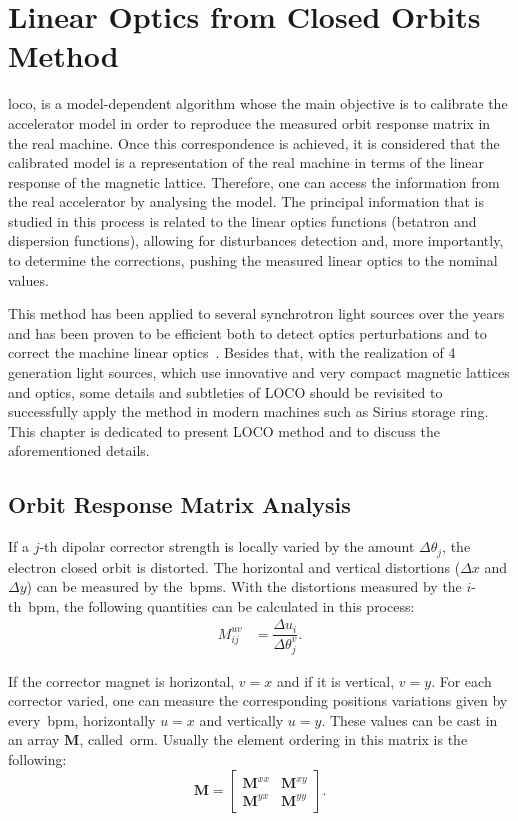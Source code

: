 \chapter{Linear Optics from Closed Orbits Method}\label{chap:loco}
\gls{loco}, is a model-dependent algorithm whose the main objective is to calibrate the accelerator model in order to reproduce the measured orbit response matrix in the real machine. Once this correspondence is achieved, it is considered that the calibrated model is a representation of the real machine in terms of the linear response of the magnetic lattice. Therefore, one can access the information from the real accelerator by analysing the model. The principal information that is studied in this process is related to the linear optics functions (betatron and dispersion functions), allowing for disturbances detection and, more importantly, to determine the corrections, pushing the measured linear optics to the nominal values.

This method has been applied to several synchrotron light sources over the years and has been proven to be efficient both to detect optics perturbations and to correct the machine linear optics~\cite{safranek1997, icfa_laurent, icfa_australia}. Besides that, with the realization of 4 generation light sources, which use innovative and very compact magnetic lattices and optics, some details and subtleties of LOCO should be revisited to successfully apply the method in modern machines such as Sirius storage ring. This chapter is dedicated to present LOCO method and to discuss the aforementioned details.
\section{Orbit Response Matrix Analysis}\label{sec:orm_analysis}
If a $j$-th dipolar corrector strength is locally varied by the amount $\Delta \theta_j$, the electron closed orbit is distorted. The horizontal and vertical distortions ($\Delta x$ and $\Delta y$) can be measured by the~\gls{bpm}s. With the distortions measured by the $i$-th~\gls{bpm}, the following quantities can be calculated in this process:
\begin{align}
    M^{uv}_{ij} &= \dfrac{\Delta u_i}{\Delta \theta_j^v}.
\end{align}

If the corrector magnet is horizontal, $v=x$ and if it is vertical, $v=y$. For each corrector varied, one can measure the corresponding positions variations given by every~\gls{bpm}, horizontally $u=x$ and vertically $u=y$. These values can be cast in an array $\mathbf{M}$, called~\gls{orm}. Usually the element ordering in this matrix is the following:
\begin{equation}
    \mathbf{M} = \begin{bmatrix}
    \mathbf{M}^{xx} & \mathbf{M}^{xy} \\
    \mathbf{M}^{yx} & \mathbf{M}^{yy} 
\end{bmatrix}.
\end{equation}

